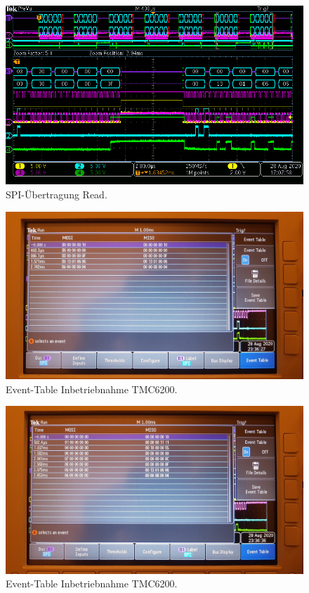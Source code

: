 \begin{figure}[H]
\center
\includegraphics[width = \textwidth]{graphics/TMC6200_Lesen}
\caption{SPI-Übertragung Read.}
\label{fig:TMC6200_Lesen}
\end{figure}

\begin{figure}[H]
\center
\includegraphics[width = \textwidth]{graphics/TMC6200_EventTable_Beschreiben_Bild}
\caption{Event-Table Inbetriebnahme TMC6200.}
\label{fig:TMC6200_EventTable_Beschreiben_Bild}
\end{figure}

\begin{figure}[H]
\center
\includegraphics[width = \textwidth]{graphics/TMC6200_EventTable_Lesen_Bild}
\caption{Event-Table Inbetriebnahme TMC6200.}
\label{fig:TMC6200_EventTable_Lesen_Bild}
\end{figure}

